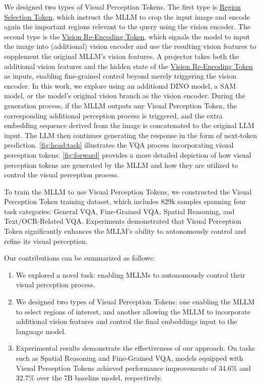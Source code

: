We designed two types of Visual Perception Tokens. The first type is \ul{Region Selection Token}, which instruct the MLLM to crop the input image and encode again the important regions relevant to the query using the vision encoder. 
The second type is the \ul{Vision Re-Encoding Token}, which signals the model to input the image into (additional) vision encoder and use the resulting vision features to supplement the original MLLM's vision features. 
A projector takes both the additional vision features and the hidden state of the \ul{Vision Re-Encoding Token} as inputs, enabling fine-grained control beyond merely triggering the vision encoder.
In this work, we explore using an additional DINO model, a SAM model, or the model’s original vision branch as the vision encoder.
During the generation process, if the MLLM outputs any Visual Perception Token, the corresponding additional perception process is triggered, and the extra embedding sequence derived from the image is concatenated to the original LLM input. The LLM then continues generating the response in the form of next-token prediction. \cref{fig:head:task} illustrates the VQA process incorporating visual perception tokens. \cref{fig:forward} provides a more detailed depiction of how visual perception tokens are generated by the MLLM and how they are utilized to control the visual perception process.

To train the MLLM to use Visual Perception Tokens, we constructed the Visual Perception Token training dataset, which includes 829k samples spanning four task categories: General VQA, Fine-Grained VQA, Spatial Reasoning, and Text/OCR-Related VQA. Experiments demonstrated that Visual Perception Token significantly enhances the MLLM's ability to autonomously control and refine its visual perception.

Our contributions can be summarized as follows:
\begin{enumerate}[labelwidth=0pt,labelsep=3pt,itemindent=0em]
\item We explored a novel task: enabling MLLMs to autonomously control their visual perception process. 
\item We designed two types of Visual Perception Tokens: one enabling the MLLM to select regions of interest, and another allowing the MLLM to incorporate additional vision features and control the final embeddings input to the language model.
\item Experimental results demonstrate the effectiveness of our approach. On tasks such as Spatial Reasoning and Fine-Grained VQA, models equipped with Visual Perception Tokens achieved performance improvements of 34.6\% and 32.7\% over the 7B baseline model, respectively.
\end{enumerate}
